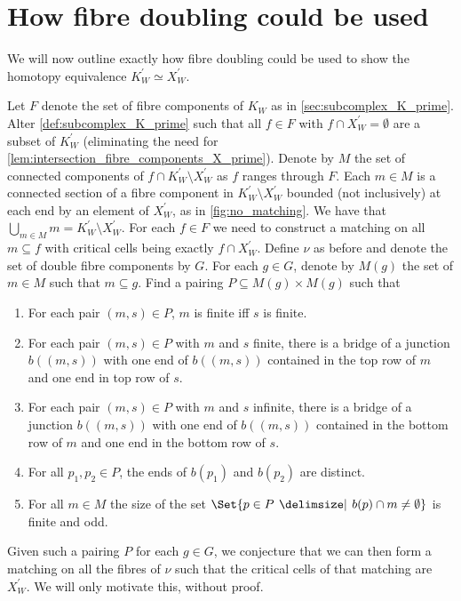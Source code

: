 \documentclass[class=article, crop=false]{standalone}
\begin{document}
\section{How fibre doubling could be used}

We will now outline exactly how fibre doubling could be used to show the homotopy equivalence $K^\prime_W \simeq X^\prime_W$.

Let $F$ denote the set of fibre components of $K_W$ as in \cref{sec:subcomplex_K_prime}. Alter \cref{def:subcomplex_K_prime} such that all $f \in F$ with $f \cap X^\prime_W = \emptyset$ are a subset of $K^\prime_W$ (eliminating the need for \cref{lem:intersection_fibre_components_X_prime}). Denote by $M$ the set of connected components of $f \cap K^\prime_W \setminus X^\prime_W$ as $f$ ranges through $F$. Each $m \in M$ is a connected section of a fibre component in $K^\prime_W \setminus X^\prime_W$ bounded (not inclusively) at each end by an element of $X^\prime_W$, as in \cref{fig:no_matching}. We have that $\bigcup_{m \in M}m = K^\prime_W \setminus X^\prime_W$.
For each $f \in F$ we need to construct a matching on all $m \subseteq f$ with critical cells being exactly $f \cap X^\prime_W$. Define $\nu$ as before and denote the set of double fibre components by $G$. For each $g \in G$, denote by $M(g)$ the set of $m \in M$ such that $m \subseteq g$. Find a pairing $P \subseteq M(g)\times M(g)$ such that
\begin{enumerate}
    \item For each pair $(m,s) \in P$, $m$ is finite iff $s$ is finite.
    \item For each pair $(m,s) \in P$ with $m$ and $s$ finite, there is a bridge of a junction $b((m,s))$ with one end of $b((m,s))$ contained in the top row of $m$ and one end in top row of $s$.
    \item For each pair $(m,s) \in P$ with $m$ and $s$ infinite, there is a bridge of a junction $b((m,s))$ with one end of $b((m,s))$ contained in the bottom row of $m$ and one end in the bottom row of $s$.
    \item For all $p_1,p_2 \in P$, the ends of $b(p_1)$ and $b(p_2)$ are distinct.
    \item For all $m \in M$ the size of the set $\Set{p \in P \given b(p) \cap m \neq \emptyset}$ is finite and odd.  
\end{enumerate}
Given such a pairing $P$ for each $g \in G$, we conjecture that we can then form a matching on all the fibres of $\nu$ such that the critical cells of that matching are $X^\prime_W$. We will only motivate this, without proof.
\end{document}
